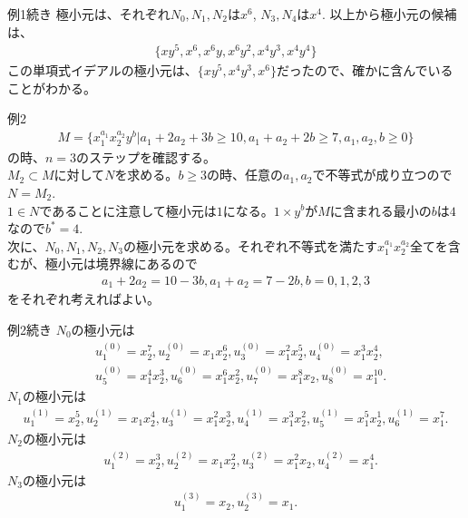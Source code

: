 \begin{frame}
	\begin{exampleblock} {例1続き}
		極小元は、それぞれ$N_0, N_1, N_2$は$x^6$, $N_3, N_4$は$x^4$.
		以上から極小元の候補は、
		\begin{align*}
			\{xy^5, x^6, x^6y, x^6y^2, x^4y^3, x^4y^4\}
		\end{align*}
		この単項式イデアルの極小元は、$\{xy^5, x^4y^3, x^6\}$だったので、確かに含んでいることがわかる。
	\end{exampleblock}

\end{frame}

\begin{frame}
	\begin{exampleblock} {例2}
		\begin{align*}
			M = \{x_1^{a_1} x_2^{a_2} y^b | a_1 + 2a_2 + 3b \geq 10, a_1 + a_2 + 2b \geq 7, a_1,a_2,b \geq 0 \}
		\end{align*}
		の時、$n=3$のステップを確認する。\\
		$M_2 \subset M$に対して$N$を求める。$b\geq 3$の時、任意の$a_1, a_2$で不等式が成り立つので$N=M_2$.\\
		$1 \in N$であることに注意して極小元は$1$になる。$1 \times y^b$が$M$に含まれる最小の$b$は$4$なので$b^*=4$.\\
		次に、$N_0, N_1, N_2, N_3$の極小元を求める。それぞれ不等式を満たす$x_1^{a_1} x_2^{a_2}$全てを含むが、極小元は境界線にあるので
		\begin{align*}
			a_1 + 2a_2 = 10 - 3b, a_1 + a_2 = 7 - 2b, b=0,1,2,3
		\end{align*}
		をそれぞれ考えればよい。
	\end{exampleblock}
\end{frame}

\begin{frame}
	\begin{exampleblock} {例2続き}
		$N_0$の極小元は
		\begin{align*}
			 & u_1^{(0)} = x_2^7, u_2^{(0)}=x_1x_2^6, u_3^{(0)}=x_1^2x_2^5, u_4^{(0)}=x_1^3x_2^4,    \\
			 & u_5^{(0)} = x_1^4x_2^3, u_6^{(0)}=x_1^6x_2^2, u_7^{(0)}=x_1^8x_2, u_8^{(0)}=x_1^{10}.
		\end{align*}
		$N_1$の極小元は
		\begin{align*}
			u_1^{(1)} = x_2^5, u_2^{(1)}=x_1x_2^4, u_3^{(1)}=x_1^2x_2^3, u_4^{(1)}=x_1^3x_2^2, u_5^{(1)} = x_1^5x_2^1, u_6^{(1)}=x_1^7.
		\end{align*}
		$N_2$の極小元は
		\begin{align*}
			 & u_1^{(2)} = x_2^3, u_2^{(2)}=x_1x_2^2, u_3^{(2)}=x_1^2x_2, u_4^{(2)}=x_1^4.
		\end{align*}
		$N_3$の極小元は
		\begin{align*}
			u_1^{(3)}=x_2, u_2^{(3)}=x_1.
		\end{align*}
	\end{exampleblock}
\end{frame}

